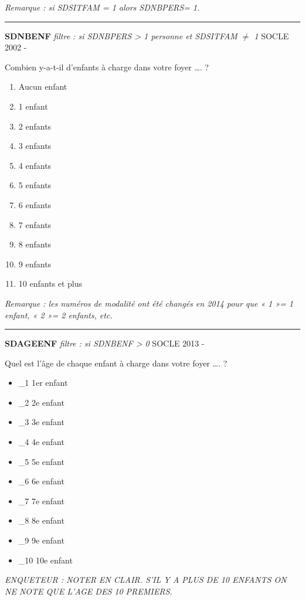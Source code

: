 \documentclass[12pt,a4paper]{reedthesis}
\providecommand{\tightlist}{%
  \setlength{\itemsep}{0pt}\setlength{\parskip}{0pt}}
\begin{document}
\emph{Remarque : si SDSITFAM = 1 alors SDNBPERS= 1.}
\begin{center}\rule{0.5\linewidth}{0.5pt}\end{center}

\textbf{SDNBENF} \emph{filtre : si SDNBPERS \textgreater{} 1 personne et SDSITFAM \(\neq\) 1} SOCLE 2002 -

Combien y-a-t-il d'enfants à charge dans votre foyer \ldots. ?
\begin{enumerate}
\def\labelenumi{\arabic{enumi}.}
\tightlist
\item
  Aucun enfant
\item
  1 enfant
\item
  2 enfants
\item
  3 enfants
\item
  4 enfants
\item
  5 enfants
\item
  6 enfants
\item
  7 enfants
\item
  8 enfants
\item
  9 enfants
\item
  10 enfants et plus
\end{enumerate}
\emph{Remarque : les numéros de modalité ont été changés en 2014 pour que « 1 »= 1 enfant, « 2 »= 2 enfants, etc.}
\begin{center}\rule{0.5\linewidth}{0.5pt}\end{center}

\textbf{SDAGEENF} \emph{filtre : si SDNBENF \textgreater{} 0} SOCLE 2013 -

Quel est l'âge de chaque enfant à charge dans votre foyer \ldots. ?
\begin{itemize}
\tightlist
\item
  \_1 1er enfant
\item
  \_2 2e enfant
\item
  \_3 3e enfant
\item
  \_4 4e enfant
\item
  \_5 5e enfant
\item
  \_6 6e enfant
\item
  \_7 7e enfant
\item
  \_8 8e enfant
\item
  \_9 9e enfant
\item
  \_10 10e enfant
\end{itemize}
\emph{ENQUETEUR : NOTER EN CLAIR. S'IL Y A PLUS DE 10 ENFANTS ON NE NOTE QUE L'AGE DES 10 PREMIERS.}
\end{document}
